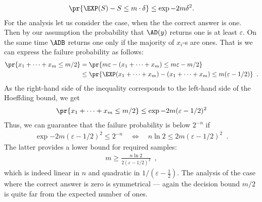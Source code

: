 \documentclass{crypto-exercise}
\begin{document}
\begin{solution}
\begin{align*}
\pr{\EXP(S) - S \leq  m\cdot\delta} \leq \exp{- 2 m\delta^2}.
\end{align*} 
For the analysis let us consider the case, when the the correct answer is one. Then by our assumption the probability that $\AD(y)$ returns one is at least $\varepsilon$. On the same time $\ADB$ returns one only if the majority of $x_i$-s are ones. That is we can express the failure probability as follows:
\begin{align*}
\pr{x_1+\cdots+x_m\leq m/2}&=\pr{m\varepsilon - (x_1+\cdots+x_m)\leq m\varepsilon -m/2}\\
&\leq\pr{\EXP(x_1+\cdots+x_m) - (x_1+\cdots+x_m)\leq m(\varepsilon -1/2)}\enspace.
\end{align*}
As the right-hand side of the inequality corresponds to the left-hand side of the Hoeffding bound, we get
\begin{align*}
\pr{x_1+\cdots+x_m\leq m/2}\leq \exp{-2m (\varepsilon-1/2)^2}
\end{align*} 
Thus, we can guarantee that the failure probability is below $2^{-n}$ if 
\begin{align*}
\exp{- 2m(\varepsilon-1/2)^2}\leq 2^{-n}\quad\Longleftrightarrow\quad
n\ln 2 \leq 2m(\varepsilon-1/2)^2\enspace.
\end{align*} 
The latter provides a lower bound for required samples:
\begin{align*}
m\geq \frac{n\ln 2}{2(\varepsilon-1/2)^2}\enspace,
\end{align*}
which is indeed linear in $n$ and quadratic in $1/(\varepsilon-\frac{1}{2})$. The analysis of the case where the correct answer is zero is symmetrical --- again the decision bound $m/2$ is quite far from the expected number of ones. 
  


\end{solution}
\end{document}
